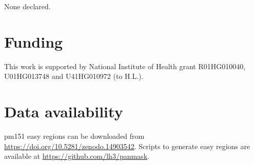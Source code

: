 \documentclass[webpdf,contemporary,large,namedate]{oup-authoring-template}%
\begin{document}
None declared.

\section*{Funding}

This work is supported by National Institute of Health grant R01HG010040, U01HG013748 and U41HG010972 (to H.L.).

\section*{Data availability}

pm151 easy regions can be downloaded from \url{https://doi.org/10.5281/zenodo.14903542}. Scripts to generate easy regions are available at \url{https://github.com/lh3/panmask}.


{\sffamily\small
}
\end{document}

